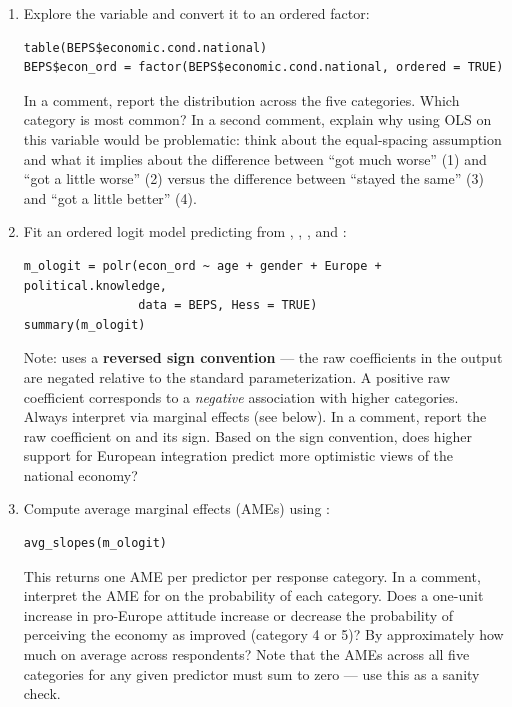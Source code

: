 \begin{enumerate}[label=\alph*)]

  \item Explore the  variable and convert it to an ordered factor:
  \begin{lstlisting}
table(BEPS$economic.cond.national)
BEPS$econ_ord = factor(BEPS$economic.cond.national, ordered = TRUE)
  \end{lstlisting}
  In a comment, report the distribution across the five categories. Which category is most common? In a second comment, explain why using OLS on this variable would be problematic: think about the equal-spacing assumption and what it implies about the difference between ``got much worse'' (1) and ``got a little worse'' (2) versus the difference between ``stayed the same'' (3) and ``got a little better'' (4).

  \item Fit an ordered logit model predicting  from , , , and :
  \begin{lstlisting}
m_ologit = polr(econ_ord ~ age + gender + Europe + political.knowledge,
                data = BEPS, Hess = TRUE)
summary(m_ologit)
  \end{lstlisting}
  Note:  uses a \textbf{reversed sign convention} --- the raw coefficients in the output are negated relative to the standard parameterization. A positive raw coefficient corresponds to a \textit{negative} association with higher categories. Always interpret via marginal effects (see below). In a comment, report the raw coefficient on  and its sign. Based on the sign convention, does higher support for European integration predict more optimistic views of the national economy?

  \item Compute average marginal effects (AMEs) using :
  \begin{lstlisting}
avg_slopes(m_ologit)
  \end{lstlisting}
  This returns one AME per predictor per response category. In a comment, interpret the AME for  on the probability of each category. Does a one-unit increase in pro-Europe attitude increase or decrease the probability of perceiving the economy as improved (category 4 or 5)? By approximately how much on average across respondents? Note that the AMEs across all five categories for any given predictor must sum to zero --- use this as a sanity check.


\end{enumerate}
